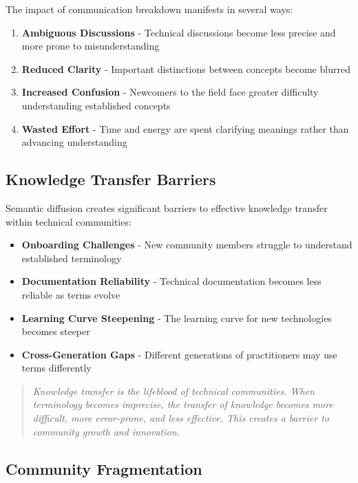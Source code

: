 \documentclass[11pt]{article}
\begin{document}
The impact of communication breakdown manifests in several ways:

\begin{enumerate}
\item \textbf{Ambiguous Discussions} - Technical discussions become less precise and more prone to misunderstanding
\item \textbf{Reduced Clarity} - Important distinctions between concepts become blurred
\item \textbf{Increased Confusion} - Newcomers to the field face greater difficulty understanding established concepts
\item \textbf{Wasted Effort} - Time and energy are spent clarifying meanings rather than advancing understanding
\end{enumerate}

\subsection{Knowledge Transfer Barriers}

Semantic diffusion creates significant barriers to effective knowledge transfer within technical communities:

\begin{itemize}
\item \textbf{Onboarding Challenges} - New community members struggle to understand established terminology
\item \textbf{Documentation Reliability} - Technical documentation becomes less reliable as terms evolve
\item \textbf{Learning Curve Steepening} - The learning curve for new technologies becomes steeper
\item \textbf{Cross-Generation Gaps} - Different generations of practitioners may use terms differently
\end{itemize}

\begin{quote}
\emph{Knowledge transfer is the lifeblood of technical communities. When terminology becomes imprecise, the transfer of knowledge becomes more difficult, more error-prone, and less effective. This creates a barrier to community growth and innovation.}
\end{quote}

\subsection{Community Fragmentation}
\end{document}
